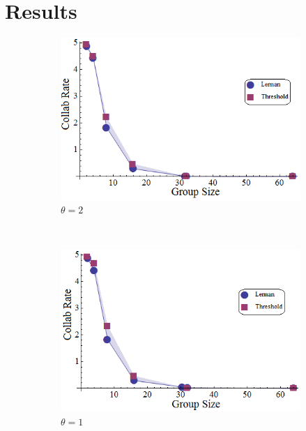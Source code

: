 \documentclass{TeXstyles/DARS/svmult}  %
\begin{document}
\section{Results}
\begin{figure}[!htb]
\begin{subfigure}{0.33\textwidth}
\centering\includegraphics[width=1.0\textwidth]{figures/LermanCollabCompare3.png}
\centering\caption{$\theta=2$}\label{fig:lercol3}
\end{subfigure}~
\begin{subfigure}{0.33\textwidth}
\centering\includegraphics[width=1.0\textwidth]{figures/LermanCollabCompare2.png}
\centering\caption{$\theta=1$}\label{fig:lercol2}
\end{subfigure}~
\begin{subfigure}{0.33\textwidth}

\end{subfigure}
\end{figure}
\end{document}
